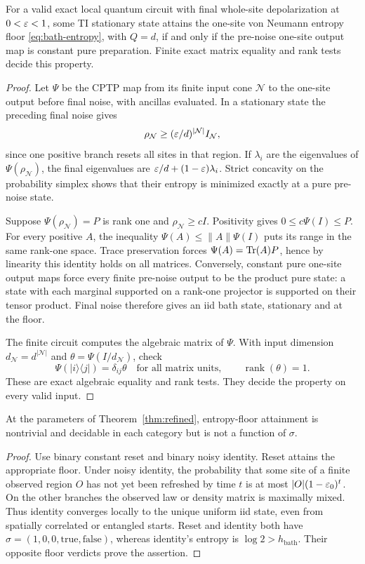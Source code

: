 \begin{theorem}\label{thm:entropy-quantum}
For a valid exact local quantum circuit with final whole-site depolarization at $0<\varepsilon<1$, some TI stationary state attains the one-site von Neumann entropy floor \eqref{eq:bath-entropy}, with $Q=d$, if and only if the pre-noise one-site output map is constant pure preparation. Finite exact matrix equality and rank tests decide this property.
\end{theorem}
\begin{proof}
Let $\Psi$ be the CPTP map from its finite input cone $\mathcal N$ to the one-site output before final noise, with ancillas evaluated. In a stationary state the preceding final noise gives
\[
 \rho_{\mathcal N}\ge (\varepsilon/d)^{|\mathcal N|}I_{\mathcal N},
\]
since one positive branch resets all sites in that region. If $\lambda_i$ are the eigenvalues of $\Psi(\rho_{\mathcal N})$, the final eigenvalues are $\varepsilon/d+(1-\varepsilon)\lambda_i$. Strict concavity on the probability simplex shows that their entropy is minimized exactly at a pure pre-noise state.

Suppose $\Psi(\rho_{\mathcal N})=P$ is rank one and $\rho_{\mathcal N}\ge cI$. Positivity gives $0\le c\Psi(I)\le P$. For every positive $A$, the inequality $\Psi(A)\le\|A\|\Psi(I)$ puts its range in the same rank-one space. Trace preservation forces $\Psi(A)=\operatorname{Tr}(A)P$, hence by linearity this identity holds on all matrices. Conversely, constant pure one-site output maps force every finite pre-noise output to be the product pure state: a state with each marginal supported on a rank-one projector is supported on their tensor product. Final noise therefore gives an iid bath state, stationary and at the floor.

The finite circuit computes the algebraic matrix of $\Psi$. With input dimension $d_{\mathcal N}=d^{|\mathcal N|}$ and $\theta=\Psi(I/d_{\mathcal N})$, check
\[
 \Psi(|i\rangle\langle j|)=\delta_{ij}\theta\quad\text{for all matrix units},
 \qquad \operatorname{rank}(\theta)=1.
\]
These are exact algebraic equality and rank tests. They decide the property on every valid input.
\end{proof}

\begin{proposition}\label{prop:boundary}
At the parameters of Theorem~\ref{thm:refined}, entropy-floor attainment is nontrivial and decidable in each category but is not a function of $\sigma$.
\end{proposition}
\begin{proof}
Use binary constant reset and binary noisy identity. Reset attains the appropriate floor. Under noisy identity, the probability that some site of a finite observed region $O$ has not yet been refreshed by time $t$ is at most $|O|(1-\varepsilon_0)^t$. On the other branches the observed law or density matrix is maximally mixed. Thus identity converges locally to the unique uniform iid state, even from spatially correlated or entangled starts. Reset and identity both have
$\sigma=(1,0,0,\mathrm{true},\mathrm{false})$, whereas identity's entropy is $\log2>h_{\mathrm{bath}}$. Their opposite floor verdicts prove the assertion.
\end{proof}

